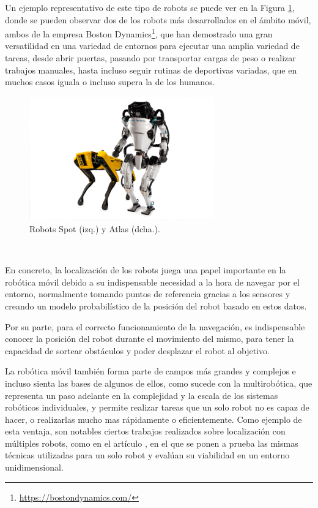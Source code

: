 Un ejemplo representativo de este tipo de robots se puede ver en la Figura
\ref{fig:boston_dynamics}, donde se pueden observar dos de los robots más
desarrollados en el ámbito móvil, ambos de la empresa Boston
Dynamics\footnote{\url{https://bostondynamics.com/}}, que han demostrado una
gran versatilidad en una variedad de entornos para ejecutar una amplia variedad
de tareas, desde abrir puertas, pasando por transportar cargas de peso o
realizar trabajos manuales, hasta incluso seguir rutinas de deportivas variadas,
que en muchos casos iguala o incluso supera la de los humanos.

\begin{figure} [h!]
  \begin{center}
    \includegraphics[width=8cm]{figs/atlas_spot_boston_dynamics}
  \end{center}
  \caption{Robots Spot (izq.) y Atlas (dcha.).}
  \label{fig:boston_dynamics}
\end{figure}\

En concreto, la localización de los robots juega una papel importante en la
robótica móvil debido a su indispensable necesidad a la hora de navegar por el
entorno, normalmente tomando puntos de referencia gracias a los sensores y
creando un modelo probabilístico de la posición del robot basado en estos datos.

Por su parte, para el correcto funcionamiento de la navegación, es indispensable
conocer la posición del robot durante el movimiento del mismo, para tener la
capacidad de sortear obstáculos y poder desplazar el robot al objetivo.

La robótica móvil también forma parte de campos más grandes y complejos e
incluso sienta las bases de algunos de ellos, como sucede con la multirobótica,
que representa un paso adelante en la complejidad y la escala de los sistemas
robóticos individuales, y permite realizar tareas que un solo robot no es capaz
de hacer, o realizarlas mucho mas rápidamente o eficientemente.
Como ejemplo de esta ventaja, son notables ciertos trabajos realizados sobre
localización con múltiples robots, como en el artículo \cite{Trawny2009}, en el
que se ponen a prueba las mismas técnicas utilizadas para un solo robot y
evalúan su viabilidad en un entorno unidimensional.

